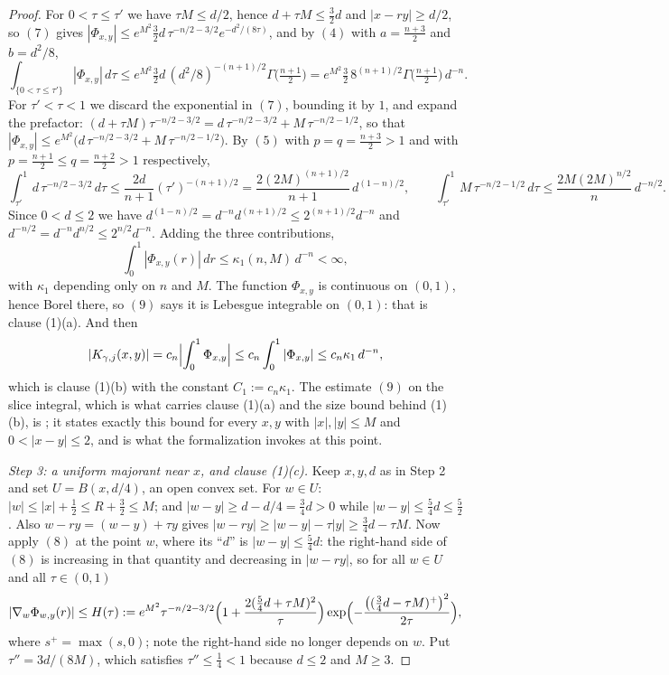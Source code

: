 \begin{proof}
For $0 < \tau \leq \tau'$ we have $\tau M \leq d/2$, hence $d + \tau M \leq
\tfrac32 d$ and $|x-ry| \geq d/2$, so $(7)$ gives
$|\Phi_{x,y}| \leq e^{M^2}\tfrac32 d\,\tau^{-n/2-3/2}e^{-d^2/(8\tau)}$, and by
$(4)$ with $a = \tfrac{n+3}{2}$ and $b = d^2/8$,
\[
  \int_{\{0<\tau\leq\tau'\}}|\Phi_{x,y}|\,d\tau
    \leq e^{M^2}\tfrac32 d\,(d^2/8)^{-(n+1)/2}\Gamma\bigl(\tfrac{n+1}{2}\bigr)
    = e^{M^2}\tfrac32\,8^{(n+1)/2}\Gamma\bigl(\tfrac{n+1}{2}\bigr)\,d^{-n} .
\]
For $\tau' < \tau < 1$ we discard the exponential in $(7)$, bounding it by $1$,
and expand the prefactor:
$(d+\tau M)\tau^{-n/2-3/2} = d\,\tau^{-n/2-3/2} + M\,\tau^{-n/2-1/2}$, so that
$|\Phi_{x,y}| \leq e^{M^2}\bigl(d\,\tau^{-n/2-3/2} + M\,\tau^{-n/2-1/2}\bigr)$.
By $(5)$ with $p = q = \tfrac{n+3}{2} > 1$ and with
$p = \tfrac{n+1}{2} \leq q = \tfrac{n+2}{2} > 1$ respectively,
\[
  \int_{\tau'}^1 d\,\tau^{-n/2-3/2}\,d\tau \leq \frac{2d}{n+1}(\tau')^{-(n+1)/2}
    = \frac{2(2M)^{(n+1)/2}}{n+1}\,d^{(1-n)/2} ,
  \qquad
  \int_{\tau'}^1 M\,\tau^{-n/2-1/2}\,d\tau \leq \frac{2M(2M)^{n/2}}{n}\,d^{-n/2} .
\]
Since $0 < d \leq 2$ we have $d^{(1-n)/2} = d^{-n}d^{(n+1)/2} \leq
2^{(n+1)/2}d^{-n}$ and $d^{-n/2} = d^{-n}d^{n/2} \leq 2^{n/2}d^{-n}$.  Adding
the three contributions,
\begin{equation*}
  \int_0^1|\Phi_{x,y}(r)|\,dr \leq \kappa_1(n,M)\,d^{-n} < \infty , \tag{9}
\end{equation*}
with $\kappa_1$ depending only on $n$ and $M$.  The function $\Phi_{x,y}$ is
continuous on $(0,1)$, hence Borel there, so $(9)$ says it is Lebesgue
integrable on $(0,1)$: that is clause (1)(a).  And then
\[
  |K_{\gamma,j}(x,y)| = c_n\Bigl|\int_0^1\Phi_{x,y}\Bigr|
    \leq c_n\int_0^1|\Phi_{x,y}| \leq c_n\kappa_1\,d^{-n} ,
\]
which is clause (1)(b) with the constant $C_1 := c_n\kappa_1$.
The estimate $(9)$ on the slice integral, which is what carries clause (1)(a) and
the size bound behind (1)(b), is ; it
states exactly this bound for every $x,y$ with $|x|,|y| \leq M$ and
$0 < |x-y| \leq 2$, and is what the formalization invokes at this point.

\emph{Step 3: a uniform majorant near $x$, and clause (1)(c).}
Keep $x,y,d$ as in Step 2 and set $U = B(x,d/4)$, an open convex set.  For
$w \in U$: $|w| \leq |x| + \tfrac12 \leq R + \tfrac32 \leq M$; and
$|w-y| \geq d - d/4 = \tfrac34 d > 0$ while $|w-y| \leq \tfrac54 d \leq
\tfrac52$.  Also $w - ry = (w-y) + \tau y$ gives
$|w-ry| \geq |w-y| - \tau|y| \geq \tfrac34 d - \tau M$.  Now apply $(8)$ at the
point $w$, where its ``$d$'' is $|w-y| \leq \tfrac54 d$: the right-hand side of
$(8)$ is increasing in that quantity and decreasing in $|w-ry|$, so for all
$w \in U$ and all $\tau \in (0,1)$
\[
  |\nabla_w\Phi_{w,y}(r)| \leq H(\tau)
    := e^{M^2}\tau^{-n/2-3/2}
       \Bigl(1 + \frac{2(\tfrac54 d+\tau M)^2}{\tau}\Bigr)
       \exp\Bigl(-\frac{\bigl((\tfrac34 d - \tau M)^+\bigr)^2}{2\tau}\Bigr) ,
\]
where $s^+ = \max(s,0)$; note the right-hand side no longer depends on $w$.
Put $\tau'' = 3d/(8M)$, which satisfies $\tau'' \leq \tfrac14 < 1$ because
$d \leq 2$ and $M \geq 3$.


\end{proof}
